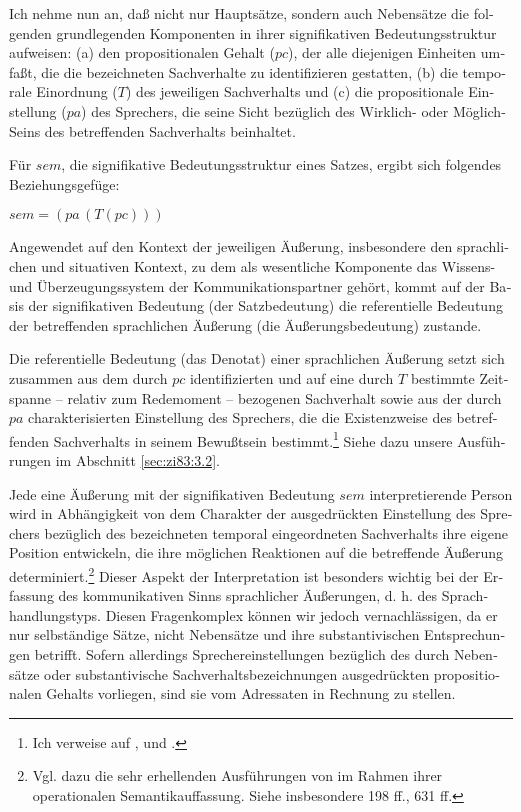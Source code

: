 \documentclass[output=paper]{langscibook}
\begin{document}
\begin{otherlanguage}{german}
Ich nehme nun an, daß nicht nur Hauptsätze, sondern auch Nebensätze die folgenden grundlegenden Komponenten in ihrer signifikativen Bedeutungsstruktur aufweisen: (a) den propositionalen Gehalt ($pc$), der alle diejenigen Einheiten umfaßt, die die bezeichneten Sachverhalte zu identifizieren ge\-statten, (b) die temporale Einordnung ($T$) des jeweiligen Sachverhalts und (c) die propositionale Einstellung ($pa$) des Sprechers, die seine Sicht bezüglich des Wirklich- oder Möglich-Seins des betreffenden Sachverhalts beinhaltet.

Für $sem$, die signifikative Bedeutungsstruktur eines Satzes, ergibt sich folgendes Beziehungsgefüge:

\ea \label{ex:zi83:12} $sem = (pa \, (T(pc)))$
\z

\noindent Angewendet auf den Kontext der jeweiligen Äußerung, insbesondere den sprachlichen und situativen Kontext, zu dem als wesentliche Komponente das Wissens- und Überzeugungssystem der Kommunikationspartner gehört, kommt auf der Basis der signifikativen Bedeutung (der Satzbedeutung) die referentielle Bedeutung der betreffenden sprachlichen Äußerung (die Äußerungsbedeutung) zu\-stan\-de.

Die referentielle Bedeutung (das Denotat) einer sprachlichen Äußerung setzt sich zusammen aus dem durch $pc$ identifizierten und auf eine durch $T$ bestimmte Zeitspanne -- relativ zum Redemoment -- bezogenen Sachverhalt sowie aus der durch $pa$ charakterisierten Einstellung des Sprechers, die die Existenzweise des betreffenden Sachverhalts in seinem Bewußtsein bestimmt.\footnote{Ich verweise auf \citet{Bierwisch80Semantic-structure}, \citet{lang1983einstellungsausdrucke-und-ausgedruckte-einstellungen} und \citet{steube1980temporale-bedeutung-im-deutschen, steube1983indirekte-rede-und-zeitverlauf}.} Siehe dazu unsere Ausführungen im Abschnitt \ref{sec:zi83:3.2}.

Jede eine Äußerung mit der signifikativen Bedeutung $sem$ interpretierende Person wird in Abhängigkeit von dem Charakter der ausgedrückten Einstellung des Sprechers bezüglich des bezeichneten temporal eingeordneten Sachverhalts ihre eigene Position entwickeln, die ihre möglichen Reaktionen auf die betreffende Äußerung determiniert.\footnote{Vgl. dazu die sehr erhellenden Ausführungen von \citet{miller1976language-and-perception} im Rahmen ihrer operationalen Semantikauffassung. Siehe insbesondere 198 ff., 631 ff.} Dieser Aspekt der Interpretation ist besonders wichtig bei der Erfassung des kommunikativen Sinns sprachlicher Äußerungen, d. h. des Sprachhandlungstyps. Diesen Fragenkomplex können wir jedoch vernachlässigen, da er nur selbständige Sätze, nicht Nebensätze und ihre substantivischen Entsprechungen betrifft. Sofern allerdings Spre\-cher\-ein\-stel\-lun\-gen bezüglich des durch Nebensätze oder substantivische Sachverhaltsbezeichnungen ausgedrückten propositionalen Gehalts vorliegen, sind sie vom Adressaten in Rechnung zu stellen.


\end{otherlanguage}
\end{document}
